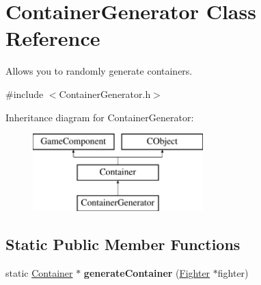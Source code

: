 \hypertarget{class_container_generator}{}\section{Container\+Generator Class Reference}
\label{class_container_generator}


Allows you to randomly generate containers.  




{\ttfamily \#include $<$Container\+Generator.\+h$>$}

Inheritance diagram for Container\+Generator\+:\begin{figure}[H]
\begin{center}
\leavevmode
\includegraphics[height=3.000000cm]{class_container_generator}
\end{center}
\end{figure}
\subsection*{Static Public Member Functions}
\begin{DoxyCompactItemize}
\item 
\hypertarget{class_container_generator_acd6c0ee638c522eeb0eb6d3f58c32778}{}\label{class_container_generator_acd6c0ee638c522eeb0eb6d3f58c32778} 
static \hyperlink{class_container}{Container} $\ast$ {\bfseries generate\+Container} (\hyperlink{class_fighter}{Fighter} $\ast$fighter)
\end{DoxyCompactItemize}
